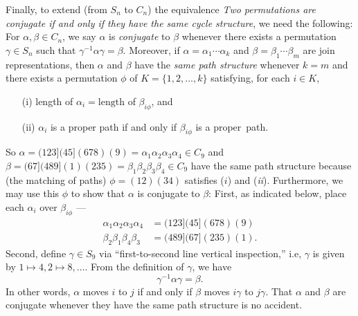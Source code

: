 \documentclass{surv-l}
\numberwithin{equation}{section}
\numberwithin{table}{section}
\numberwithin{figure}{section}
\theoremstyle{plain}
\theoremstyle{definition}
\begin{document}
Finally, to extend (from $S_{n}$ to $C_{n}$) the equivalence \emph{Two permutations are conjugate if
and only if they have the same cycle structure}, we need the
following: For $\alpha,\beta\in C_{n}$, we say $\alpha$ is
\emph{conjugate} to $\beta$ whenever there exists a permutation
$\gamma\in S_{n}$ such that $\gamma^{-1}\alpha\gamma=\beta$.
Moreover, if $\alpha=\alpha_{1}\cdots\alpha_{k}$ and
$\beta=\beta_{1}\cdots\beta_{m}$ are join representations, then
$\alpha$ and $\beta$ have the \emph{same path structure} whenever
$k=m$ and there exists a permutation $\phi$ of $K= \{1,2,\ldots,
k\}$ satisfying, for each $i\in K$,
\begin{enumerate}
\item[(i)] length of $\alpha_{i}= \mathrm{length}$ of $\beta_{i\phi}$, and

\item[(ii)] $\alpha_{i}$ is a proper path if and only if $\beta_{i\phi}$
is a proper~path.
\end{enumerate}
So
$\alpha=(123](45](678)(9)=\alpha_{1}\alpha_{2}\alpha_{3}\alpha_{4}\in
C_{9}$ and $\beta=(67](489](1)(235)=
\beta_{1}\beta_{2}\beta_{3}\beta_{4}\in C_{9}$ have the same path
structure because (the matching of paths) $\phi =(12)(34)$
satisfies ($i$) and (\emph{ii}). Furthermore, we may use this
$\phi$ to show that $\alpha$ is conjugate to $\beta$: First, as
indicated below, place each $\alpha_{i}$ over $\beta_{i\phi}$ ---
\begin{align*}
\alpha_{1}\alpha_{2}\alpha_{3}\alpha_{4}&=(123](45](678)(9) \\
\beta_{2}\beta_{1}\beta_{4}\beta_{3}&=(489](67](235)(1).
\end{align*}
Second, define $\gamma\in S_{9}$ via ``first-to-second line
vertical inspection,'' i.e, $\gamma$ is given by $1\mapsto
4,2\mapsto 8,\ldots.$ From the definition of $\gamma$, we have
\[
\gamma^{-1}\alpha\gamma=\beta.
\]
In other words, $\alpha$ moves $i$ to $j$ if and only if $\beta$
moves $i\gamma$ to $j\gamma$. That $\alpha$ and $\beta$ are
conjugate whenever they have the same path structure is no
accident.
\end{document}
